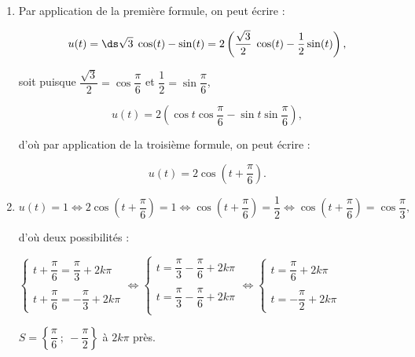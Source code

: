 \medskip

\begin{enumerate}
\item Par application de la première formule, on peut écrire :

\[u(t)= \ds\sqrt{3}\;\cos (t) - \sin (t) = 2\left(\dfrac{\sqrt{3}}{2}\;\cos (t) - \dfrac12\sin (t)\right),\]

soit puisque $\dfrac{\sqrt{3}}{2} = \cos \dfrac{\pi}{6}$ et $\dfrac{1}{2} = \sin \dfrac{\pi}{6}$,

\[u(t) = 2\left(\cos t \cos \dfrac{\pi}{6} - \sin t \sin \dfrac{\pi}{6} \right),\]

d'où par application de la troisième formule, on peut écrire :

\[u(t) = 2\cos \left(t + \dfrac{\pi}{6} \right).\]

\item $u(t)=1 \iff 2\cos \left(t + \dfrac{\pi}{6} \right) = 1 \iff \cos \left(t + \dfrac{\pi}{6} \right) = \dfrac 12 \iff \cos \left(t + \dfrac{\pi}{6} \right) = \cos \dfrac{\pi}{3},$

d'où deux possibilités :

$\left\{\begin{array}{l}
t + \dfrac{\pi}{6} = \dfrac{\pi}{3} + 2k \pi \\
\\
t + \dfrac{\pi}{6} = -\dfrac{\pi}{3} + 2k \pi
\end{array}\right. \iff \left\{\begin{array}{l}
t = \dfrac{\pi}{3} - \dfrac{\pi}{6} + 2k\pi \\
\\
t = \dfrac{\pi}{3} - \dfrac{\pi}{6} + 2k\pi \\
\end{array}\right. \iff
\left\{\begin{array}{l}
t = \dfrac{\pi}{6} + 2k\pi\\
\\
t = -\dfrac{\pi}{2} + 2k\pi
\end{array}\right.$

$S = \left\{\dfrac{\pi}{6}~;~-\dfrac{\pi}{2} \right\}$ à $2k\pi$ près.
\end{enumerate}

